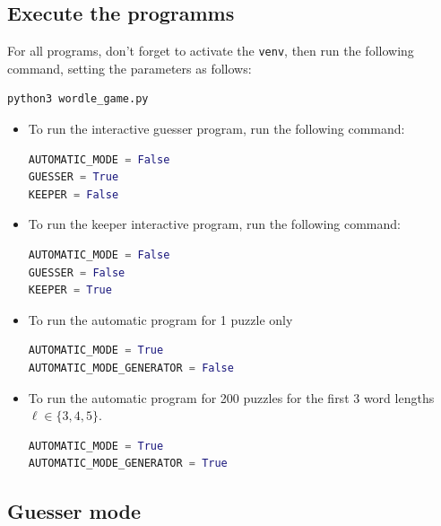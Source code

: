 \documentclass[10pt,a4paper,hidelinks]{article}
\begin{document}
\subsection*{Execute the programms}
\label{section:notice_wordle}
For all programs, don't forget to activate the \verb|venv|, then run the following command, setting the parameters as follows:
\begin{lstlisting}[language=Python]
python3 wordle_game.py
\end{lstlisting}
\begin{itemize}
    \item To run the interactive guesser program, run the following command:
\begin{lstlisting}[language=Python]
AUTOMATIC_MODE = False
GUESSER = True
KEEPER = False
\end{lstlisting}
    \item To run the keeper interactive program, run the following command:
\begin{lstlisting}[language=Python]
AUTOMATIC_MODE = False
GUESSER = False
KEEPER = True
\end{lstlisting}
    \item To run the automatic program for 1 puzzle only
\begin{lstlisting}[language=Python]
AUTOMATIC_MODE = True
AUTOMATIC_MODE_GENERATOR = False
\end{lstlisting}
    \item To run the automatic program for 200 puzzles for the first 3 word lengths $\ell\in\{3, 4, 5\}$.
\begin{lstlisting}[language=Python]
AUTOMATIC_MODE = True
AUTOMATIC_MODE_GENERATOR = True
\end{lstlisting}
\end{itemize}

\subsection{Guesser mode}
\end{document}
